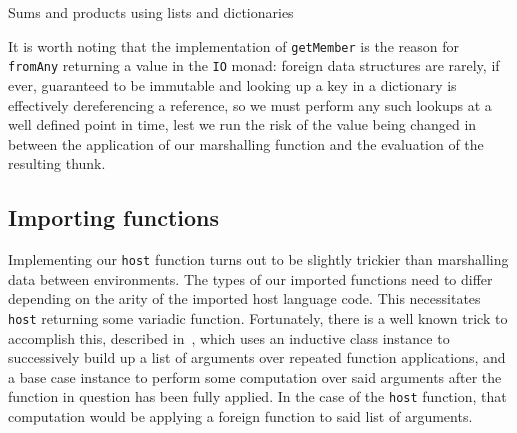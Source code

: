 \documentclass[preprint]{sigplanconf}
\begin{document}
\begin{listingfloat}
\caption{Sums and products using lists and dictionaries}
\label{lst:sumprod}
\end{listingfloat}

It is worth noting that the implementation of \lstinline!getMember! is
the reason for \lstinline!fromAny! returning a value in the \lstinline!IO!
monad: foreign data structures are rarely, if ever, guaranteed to be immutable
and looking up a key in a dictionary is effectively dereferencing a reference,
so we must perform any such lookups at a well defined point in time,
lest we run the risk of the value being changed in between the application
of our marshalling function and the evaluation of the resulting thunk.

\subsection{Importing functions}\label{sec:import}
Implementing our \lstinline!host! function turns out to be slightly trickier
than marshalling data between environments.
The types of our imported functions need to differ depending on the arity of
the imported host language code. This necessitates \lstinline!host! returning
some variadic function. Fortunately, there is a well known trick to accomplish
this, described in\ \cite{printf}, which uses an inductive class instance to
successively build up a list of arguments over repeated function applications,
and a base case instance to perform some computation over said arguments after
the function in question has been fully applied.
In the case of the \lstinline!host! function, that computation would be
applying a foreign function to said list of arguments.
\end{document}
